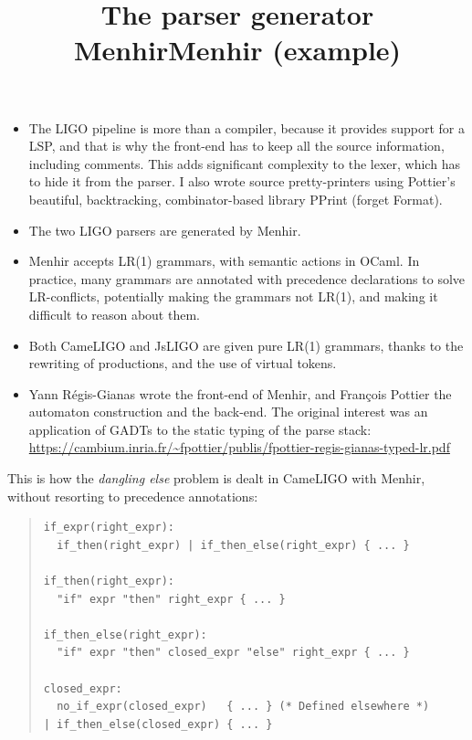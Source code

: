 \documentclass[wide]{slides}
\newcommand{\JsLIGO}[0]{\textsf{JsLIGO}}
\newcommand{\CameLIGO}[0]{\textsf{CameLIGO}}
\newcommand{\OCaml}[0]{\textsf{OCaml}}
\newcommand{\Menhir}[0]{\textsf{Menhir}}
\begin{document}
\begin{slide}
  \title{The parser generator Menhir}

  \begin{itemize}

    \item The LIGO pipeline is more than a compiler, because it
      provides support for a LSP, and that is why the front-end has to
      keep all the source information, including comments. This adds
      significant complexity to the lexer, which has to hide it from
      the parser. I also wrote source pretty\hyp{}printers using
      Pottier's beautiful, backtracking, combinator\hyp{}based library
      \textsf{PPrint} (forget \textsf{Format}).

    \item The two LIGO parsers are generated by \Menhir{}.

    \item \Menhir{} accepts LR(1) grammars, with semantic
      actions in \OCaml{}. In practice, many grammars are
      annotated with precedence declarations to solve
      LR\hyp{}conflicts, potentially making the grammars not LR(1),
      and making it difficult to reason about them.

    \item Both \CameLIGO{} and \JsLIGO{} are given pure
      LR(1) grammars, thanks to the rewriting of productions, and the
      use of virtual tokens.

    \item Yann Régis-Gianas wrote the front-end of \Menhir{}, and
      François Pottier the automaton construction and the
      back\hyp{}end. The original interest was an application of GADTs
      to the static typing of the parse stack: \url{https://cambium.inria.fr/~fpottier/publis/fpottier-regis-gianas-typed-lr.pdf}
  \end{itemize}
\end{slide}

\begin{slide}
  \title{Menhir (example)}

  This is how the \emph{dangling else} problem is dealt in \CameLIGO{}
  with \Menhir{}, without resorting to precedence annotations:
  \begin{quote}
    \small
  \begin{verbatim}
if_expr(right_expr):
  if_then(right_expr) | if_then_else(right_expr) { ... }

if_then(right_expr):
  "if" expr "then" right_expr { ... }

if_then_else(right_expr):
  "if" expr "then" closed_expr "else" right_expr { ... }

closed_expr:
  no_if_expr(closed_expr)   { ... } (* Defined elsewhere *)
| if_then_else(closed_expr) { ... }
\end{verbatim}
  \end{quote}

\end{slide}
\end{document}
